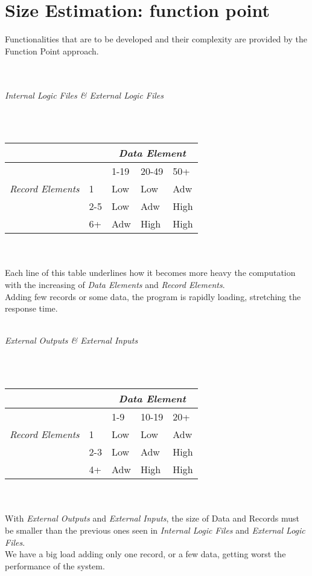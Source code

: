 \documentclass[11pt,a4paper]{report}
\begin{document}
\section{Size Estimation: function point}
Functionalities that are to be developed and their complexity are provided by the Function Point approach.\\
\\\\
\centerline{\textit{Internal Logic Files \& External Logic Files}}
\\\\
\begin{tabularx}{\textwidth}{|X|X|X|X|X|}
	\hline
	\multicolumn{2}{|X|}{} & \multicolumn{3}{|c|}{\textit{Data Element}}\\
	\hline
	\multirow{3}{*}{\textit{Record Elements}} & & 1-19 & 20-49 & 50+\\
	\hline
	 & 1 & Low & Low & Adw\\
	 & 2-5 & Low & Adw & High\\
	 & 6+ & Adw & High & High\\
	\hline
\end{tabularx}
\\\\
Each line of this table underlines how it becomes more heavy the computation with the increasing of \textit{Data Elements} and \textit{Record Elements}.\\
Adding few records or some data, the program is rapidly loading, stretching the response time.
\\\\
\centerline{\textit{External Outputs \& External Inputs}}
\\\\
\begin{tabularx}{\textwidth}{|X|X|X|X|X|}
	\hline
	\multicolumn{2}{|X|}{} & \multicolumn{3}{|c|}{\textit{Data Element}}\\
	\hline
	\multirow{3}{*}{\textit{Record Elements}} & & 1-9 & 10-19 & 20+\\
	\hline
	& 1 & Low & Low & Adw\\
	& 2-3 & Low & Adw & High\\
	& 4+ & Adw & High & High\\
	\hline
\end{tabularx}
\\\\
With \textit{External Outputs} and \textit{External Inputs}, the size of Data and Records must be smaller than the previous ones seen in \textit{Internal Logic Files} and \textit{External Logic Files}.\\We have a big load adding only one record, or a few data, getting worst the performance of the system.
\end{document}
